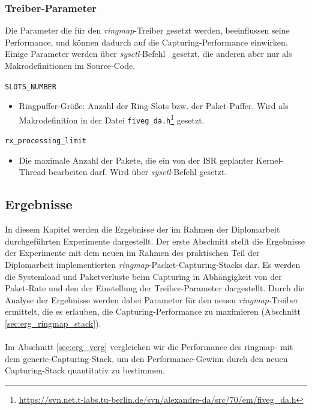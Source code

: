 \subsubsection{Treiber-Parameter}
Die Parameter die für den \emph{ringmap}-Treiber gesetzt werden, beeinflussen
seine Performance, und können dadurch auf die Capturing-Performance einwirken.
Einige Parameter werden über \emph{sysctl}-Befehl~\cite{man_sysctl} gesetzt,
die anderen aber nur als Makrodefinitionen im Source-Code.
%
\begin{description}
	\item \verb+SLOTS_NUMBER+
		\begin{itemize}
			\item Ringpuffer-Größe: Anzahl der Ring-Slots bzw. der
				Paket-Puffer. Wird als Makrodefinition in der Datei
				\verb+fiveg_da.h+\footnote{\url{https://svn.net.t-labs.tu-berlin.de/svn/alexandre-da/src/70/em/fiveg_da.h}} gesetzt.
		\end{itemize}
	\item \verb+rx_processing_limit+
		\begin{itemize}
			\item Die maximale Anzahl der Pakete, die ein von der ISR geplanter
				Kernel-Thread bearbeiten darf. Wird über \emph{sysctl}-Befehl
				gesetzt. 
		\end{itemize}
\end{description}
\subsection{Ergebnisse}\label{sec:test_ergebnisse}
In diesem Kapitel werden die Ergebnisse der im Rahmen der Diplomarbeit
durchgeführten Experimente dargestellt. Der erste Abschnitt stellt die
Ergebnisse der Experimente mit dem neuen im Rahmen des praktischen Teil der
Diplomarbeit implementierten \emph{ringmap}-Packet-Capturing-Stacks dar. Es
werden die Systemload und Paketverluste beim Capturing in Abhängigkeit von der
Paket-Rate und den der Einstellung der Treiber-Parameter dargestellt. Durch die
Analyse der Ergebnisse werden dabei Parameter für den neuen
\emph{ringmap}-Treiber ermittelt, die es erlauben, die Capturing-Performance zu
maximieren (Abschnitt \ref{sec:erg_ringmap_stack}). \\\\
% 
Im Abschnitt \ref{sec:erg_verg} vergleichen wir die Performance des ringmap-
mit dem generic-Capturing-Stack, um den Performance-Gewinn durch den neuen
Capturing-Stack quantitativ zu bestimmen.

